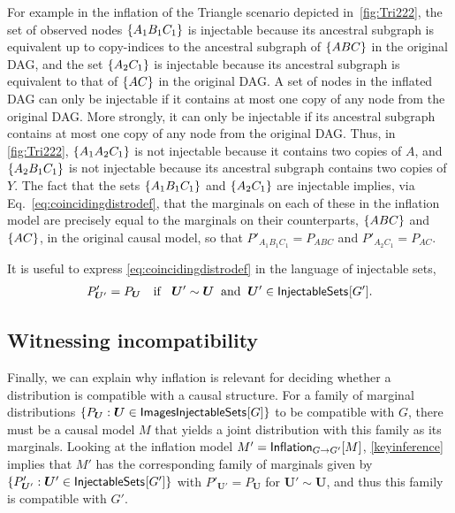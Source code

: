 For example in the inflation of the Triangle scenario depicted in~\cref{fig:Tri222}, the set of observed nodes $\brackets{A_1 B_1 C_1}$ is injectable because its ancestral subgraph is equivalent up to copy-indices to the ancestral subgraph of $\brackets{A B C}$ in the original DAG, and the set $\brackets{A_2 C_1}$ is injectable because its ancestral subgraph is equivalent to that of $\brackets{ A C}$ in the original DAG. A set of nodes in the inflated DAG can only be injectable if it contains at most one copy of any node from the original DAG. More strongly, it can only be injectable if its ancestral subgraph contains at most one copy of any node from the original DAG.  
Thus, in \cref{fig:Tri222}, $\brackets{A_1 A_2 C_1}$ is not injectable because it contains two copies of $A$, and $\brackets{A_2 B_1 C_1}$ is not injectable because its ancestral subgraph contains two copies of $Y$. The fact that the sets $\brackets{A_1 B_1 C_1}$ and $\brackets{A_2 C_1}$ are injectable implies, via Eq.~\eqref{eq:coincidingdistrodef}, that the marginals on each of these in the inflation model are precisely equal to the marginals on their counterparts, $\brackets{A B C}$ and $\brackets{A C}$, in the original causal model, so that $P'_{A_1 B_1 C_1} = P_{A B C}$ and $P'_{A_2 C_1} = P_{A C}$.

It is useful to express \cref{eq:coincidingdistrodef} in the language of injectable sets,
\begin{align}\label{keyinference}
P'_{\bm{U}'}=P_{\bm{U}}\quad\text{if }  \;\; \bm{U}' \sim \bm{U}\;\; \text{and} \;\; \bm{U}'\in\SmallNamedFunction{InjectableSets}{G'}.%
\end{align}

\subsection{Witnessing incompatibility\label{subsec:witnessingincompat}}

Finally, we can explain why inflation is relevant for deciding whether a distribution is compatible with a causal structure.  For a family of marginal distributions $\{ P_{\bm{U}} : \bm{U} \in \SmallNamedFunction{ImagesInjectableSets}{G}\}$ to be compatible with $G$, there must be a causal model $M$ that yields a joint distribution with this family as its marginals. Looking at the inflation model $M' = \SmallNamedFunction[G\to G']{Inflation}{M}$, \cref{keyinference} implies that $M'$ has the corresponding family of marginals given by $\{ P'_{\bm{U}'} : \bm{U}' \in \SmallNamedFunction{InjectableSets}{G'}\}$ with $P'_{\bm{U}'} = P_{\bm{U}}$ for $\bm{U}'\sim\bm{U}$, and thus this family is compatible with $G'$.

